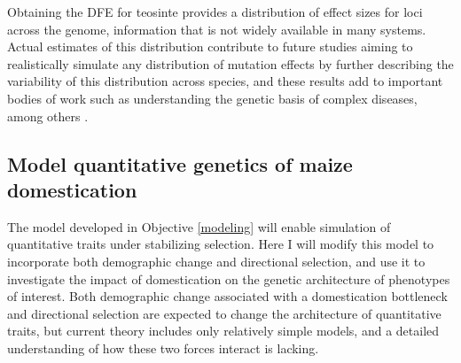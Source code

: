 Obtaining the DFE for teosinte provides a distribution of effect sizes for loci across the genome, information that is not widely available in many systems. Actual estimates of this distribution contribute to future studies aiming to realistically simulate any distribution of mutation effects by further describing the variability of this distribution across species, and these results add to important bodies of work such as understanding the genetic basis of complex diseases, among others \citep{EyreWalker:2007dl}. 



		
\subsection{Model quantitative genetics of maize domestication}
\label{domestication}
The model developed in Objective \ref{modeling} will enable simulation of quantitative traits under stabilizing selection. Here I will modify this model to incorporate both demographic change and directional selection, and use it to investigate the impact of domestication on the genetic architecture of phenotypes of interest. Both demographic change associated with a domestication bottleneck and directional selection are expected to change the architecture of quantitative traits, but current theory includes only relatively simple models, and a detailed understanding of how these two forces interact is lacking. 

